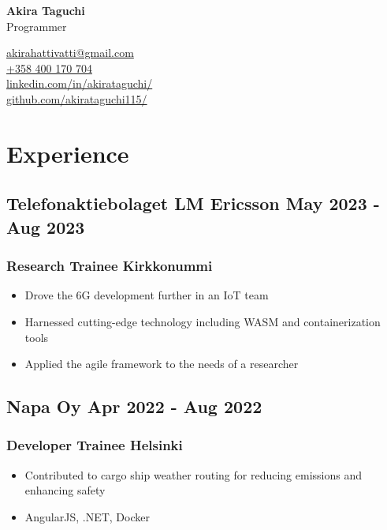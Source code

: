 \documentclass[11pt]{article} %
\begin{document}
\begin{center}
	\begin{minipage}{0.5\textwidth}
		{\Huge\bfseries
			Akira Taguchi %
		} \\ \medskip
		Programmer %
	\end{minipage} \hfill
	\begin{minipage}{0.4\textwidth}
		\raggedleft
		\href{mailto:akirahattivatti@gmail.com}{akirahattivatti@gmail.com} \\
		\href{tel:+358400170704}{+358 400 170 704} \\
		\href{https://www.linkedin.com/in/akirataguchi/}{linkedin.com/in/akirataguchi/} \\
		\href{https://github.com/akirataguchi115/}{github.com/akirataguchi115/}
	\end{minipage}
\end{center}

\section{Experience}
\subsection{Telefonaktiebolaget LM Ericsson \hfill May 2023 - Aug 2023}
\subsubsection{Research Trainee \hfill  Kirkkonummi}
\begin{itemize}
  \item Drove the 6G development further in an IoT team
  \item Harnessed cutting-edge technology including WASM and containerization tools
	\item Applied the agile framework to the needs of a researcher
\end{itemize}

\subsection{Napa Oy \hfill Apr 2022 - Aug 2022}
\subsubsection{Developer Trainee \hfill Helsinki}
\begin{itemize}
	\item Contributed to cargo ship weather routing for reducing emissions and enhancing safety
	\item AngularJS, .NET, Docker
\end{itemize}
\end{document}
